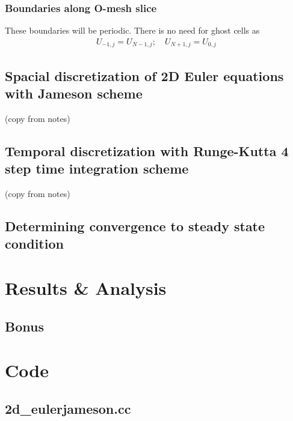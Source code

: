 \documentclass[11pt]{article}
\begin{document}
		\subsubsection{Boundaries along O-mesh slice}
		These boundaries will be periodic. There is no need for ghost cells as
			\begin{align}
			U_{-1,j} = U_{N-1,j}; \quad U_{N+1,j} = U_{0,j}
			\end{align}
	\subsection{Spacial discretization of 2D Euler equations with Jameson scheme}
	(copy from notes)
	
	\subsection{Temporal discretization with Runge-Kutta 4 step time integration scheme}
	(copy from notes)
	
	\subsection{Determining convergence to steady state condition}

\section{Results \& Analysis}	
		
	
\subsection{Bonus}

	
	

\pagebreak
\appendix
\section{Code}
	\subsection{2d\_euler\-jameson.cc}
%		
		
	
\end{document}

